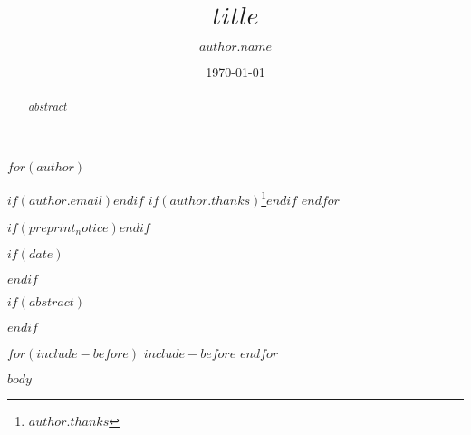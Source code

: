 \documentclass[$for(classoption)$$classoption$$sep$,$endfor$]{JASA}
\begin{document}

\title[$if(shorttitle)$$shorttitle$$endif$]{$title$}



$for(author)$
\author{$author.name$}
$if(author.email)$$endif$
$if(author.thanks)$\thanks{$author.thanks$}$endif$
$endfor$


$if(preprint_notice)$$endif$


$if(date)$\date{\today}$endif$

$if(abstract)$
\begin{abstract}
$abstract$
\end{abstract}
$endif$


\maketitle



$for(include-before)$
$include-before$
$endfor$

$body$

\end{document}

